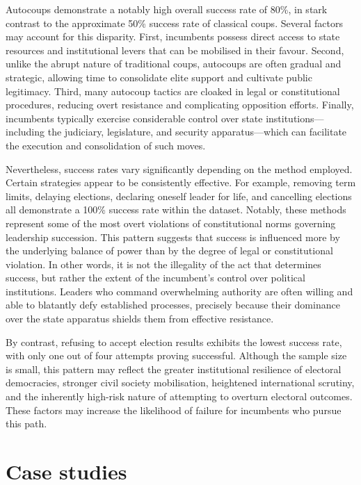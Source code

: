 \documentclass[
  12pt,
]{report}
\begin{document}
Autocoups demonstrate a notably high overall success rate of 80\%, in
stark contrast to the approximate 50\% success rate of classical coups.
Several factors may account for this disparity. First, incumbents
possess direct access to state resources and institutional levers that
can be mobilised in their favour. Second, unlike the abrupt nature of
traditional coups, autocoups are often gradual and strategic, allowing
time to consolidate elite support and cultivate public legitimacy.
Third, many autocoup tactics are cloaked in legal or constitutional
procedures, reducing overt resistance and complicating opposition
efforts. Finally, incumbents typically exercise considerable control
over state institutions---including the judiciary, legislature, and
security apparatus---which can facilitate the execution and
consolidation of such moves.

Nevertheless, success rates vary significantly depending on the method
employed. Certain strategies appear to be consistently effective. For
example, removing term limits, delaying elections, declaring oneself
leader for life, and cancelling elections all demonstrate a 100\%
success rate within the dataset. Notably, these methods represent some
of the most overt violations of constitutional norms governing
leadership succession. This pattern suggests that success is influenced
more by the underlying balance of power than by the degree of legal or
constitutional violation. In other words, it is not the illegality of
the act that determines success, but rather the extent of the
incumbent's control over political institutions. Leaders who command
overwhelming authority are often willing and able to blatantly defy
established processes, precisely because their dominance over the state
apparatus shields them from effective resistance.

By contrast, refusing to accept election results exhibits the lowest
success rate, with only one out of four attempts proving successful.
Although the sample size is small, this pattern may reflect the greater
institutional resilience of electoral democracies, stronger civil
society mobilisation, heightened international scrutiny, and the
inherently high-risk nature of attempting to overturn electoral
outcomes. These factors may increase the likelihood of failure for
incumbents who pursue this path.

\section{Case studies}\label{case-studies}
\end{document}
